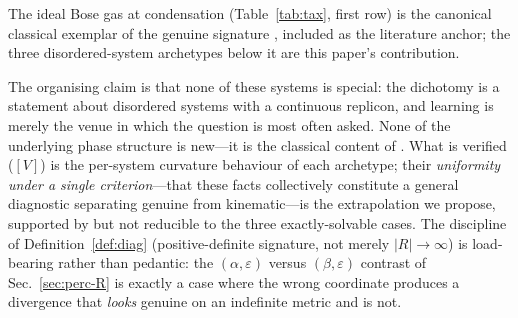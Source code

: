 \documentclass[a4paper,11pt]{article}
\theoremstyle{plain}
\theoremstyle{definition}
\theoremstyle{remark}
\newcommand{\Ric}{R}
\newcommand{\eps}{\varepsilon}
\begin{document}
The ideal Bose gas at condensation (Table~\ref{tab:tax}, first row) is the canonical classical exemplar of
the genuine signature \cite{janyszek1990}, included as the literature anchor; the three disordered-system
archetypes below it are this paper's contribution.

The organising claim is that none of these systems is special: the dichotomy is a statement about disordered
systems with a continuous replicon, and learning is merely the venue in which the question is most often
asked. None of the underlying phase structure is new---it is the classical content of
\cite{gardner1988,gardnerderrida1988,krauthmezard1989,sk1975,at1978}. What is verified ($[V]$) is the
per-system curvature behaviour of each archetype; their \emph{uniformity under a single criterion}---that
these facts collectively constitute a general diagnostic separating genuine from kinematic---is the
extrapolation we propose, supported by but not reducible to the three exactly-solvable cases. The discipline
of Definition~\ref{def:diag} (positive-definite signature, not merely $|\Ric|\to\infty$) is load-bearing
rather than pedantic: the $(\alpha,\eps)$ versus $(\beta,\eps)$ contrast of Sec.~\ref{sec:perc-R} is exactly
a case where the wrong coordinate produces a divergence that \emph{looks} genuine on an indefinite metric and
is not.
\end{document}
